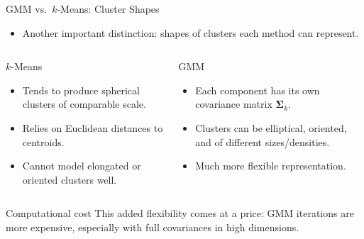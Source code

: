 \begin{frame}{GMM vs.\ $k$-Means: Cluster Shapes}
  \begin{itemize}
    \item Another important distinction: shapes of clusters each method can represent.
  \end{itemize}
  \begin{columns}[t]
      \begin{block}{$k$-Means}
        \begin{itemize}
          \item Tends to produce \alert{spherical} clusters of comparable scale.
          \item Relies on Euclidean distances to centroids.
          \item Cannot model elongated or oriented clusters well.
        \end{itemize}
      \end{block}
      \begin{block}{GMM}
        \begin{itemize}
          \item Each component has its own \alert{covariance matrix} $\boldsymbol{\Sigma}_k$.
          \item Clusters can be \alert{elliptical, oriented}, and of different sizes/densities.
          \item Much more flexible representation.
        \end{itemize}
      \end{block}
  \end{columns}
  \vspace{0.6em}
  \begin{alertblock}{Computational cost}
    This added flexibility comes at a price: GMM iterations are more expensive, especially
    with full covariances in high dimensions.
  \end{alertblock}
\end{frame}

